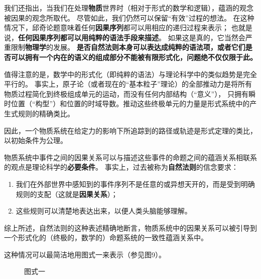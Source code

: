 \documentclass[a4paper,12pt]{article}
\begin{document}
我们还指出，当我们在处理\textbf{\gls{物质}}世界时（相对于形式的数学和\gls{逻辑}），\gls{蕴涵}的观念被\gls{因果}的观念所取代。
尽管如此，我们仍然可以保留“有效”过程的想法。 在这种情况下，\gls{邱奇论题}意味着任何\textbf{\gls{因果序列}}都可以用相应的递归过程来表示；
也就是说，\textbf{任何\gls{因果序列}都可以用纯粹的\gls{语法}手段来描述}。 如果这是真的，它当然会严重限制\textbf{物理学}的发展。
\textbf{是否\gls{自然法则}本身可以表达成纯粹的\gls{语法项}，或者它们是否可以拥有一个内在的\gls{语义}的组成部分不能被有限\gls{形式化}，问题绝不仅仅限于此。}

值得注意的是，数学中的\gls{形式化}（即纯粹的\gls{语法}）与理论科学中的类似趋势是完全平行的。
事实上，原子论（或者现在的“基本粒子”理论）的全部推动力是将所有\gls{物质过程}简化到终极组成单元的运动，而没有任何内部结构（“意义”），
只拥有瞬时位置（“构型”）和位置的时域导数。推动这些终极单元的力量是\gls{形式系统}中的产生式规则的精确类比。

因此，一个\gls{物质系统}在给定力的影响下所追踪到的路径或轨迹是形式定理的类比，以初始条件为\gls{公理}。

\gls{物质系统}中\gls{事件}之间的\gls{因果关系}可以与描述这些事件的\gls{命题}之间的\gls{蕴涵关系}相联系的观点是理论科学的\textbf{必要条件}。
事实上，过去被称为\textbf{\gls{自然法则}}的信念要求：
\begin{enumerate}[label=(\alph*)]
\item 我们在外部世界中感知到的\gls{事件序列}不是任意的或异想天开的，而是受到明确规则的支配（这就是\textbf{\gls{因果关系}}）；
\item 这些规则可以清楚地表达出来，以便人类头脑能够理解。
\end{enumerate}
综上所述，\gls{自然法则}的这种表述精确地断言，\gls{物质系统}中的\gls{因果关系}可以被引导到一个\gls{形式化}的（终极的，数学的）\gls{命题系统}的一致性\gls{蕴涵关系}中。

这种情况可以最简洁地用图式一来表示（参见图9）。

\begin{figure}[ht]
\centering
{}
\caption{图式一}
\end{figure}
\end{document}
